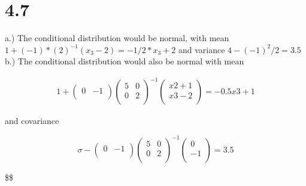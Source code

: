 \documentclass[
]{article}
\begin{document}
\hypertarget{section-1}{%
\section{4.7}\label{section-1}}

a.) The conditional distribution would be normal, with mean
\(1 + (-1) * (2)^{-1}(x_3 - 2) = -1/2*x_3 + 2\) and variance
\(4 − (−1)^2/2 = 3.5\) b.) The conditional distribution would also be
normal with mean

\begin{align*}
1 + \begin{pmatrix} 0 & −1 \\
\end{pmatrix}
\begin{pmatrix}
5 & 0 \\
0 & 2 \\ \end{pmatrix} ^{−1}
\begin{pmatrix}
x2 + 1 \\
x3 − 2 \\
\end{pmatrix}
= −0.5x3 + 1
\end{align*}

and covariance

\[
\sigma - \begin{pmatrix} 0 & −1 \\
\end{pmatrix}\begin{pmatrix}
5 & 0 \\
0 & 2 \\ \end{pmatrix} ^{−1} \begin{pmatrix}
0 \\
-1 \\
\end{pmatrix} = 3.5
\]

\$\$
\end{document}
